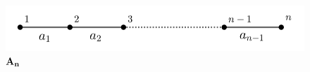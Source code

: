 \begin{figure}[H]
    \centering
    \includegraphics[width=0.9\linewidth]{pictures/An.png}
    \caption{$\bf A_n$}
    \label{An:image}
\end{figure}